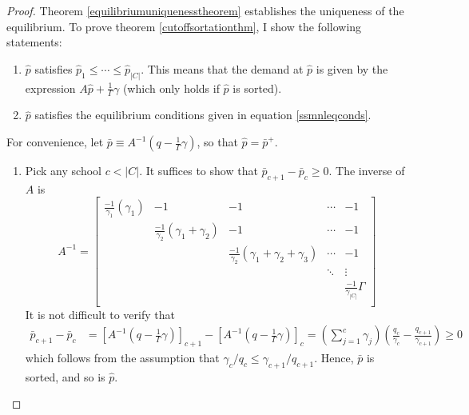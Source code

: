 \documentclass[12pt]{article}
\numberwithin{equation}{subsection}
\theoremstyle{definition}
\begin{document}
\begin{proof}
Theorem \ref{equilibriumuniquenesstheorem} establishes the uniqueness of the equilibrium. To prove theorem \ref{cutoffsortationthm}, I show the following statements:
\begin{enumerate}
\item $\hat p$ satisfies $\hat p_1 \leq \cdots \leq \hat p_{|C|}$. This means that the demand at $\hat p$ is given by the expression $A \hat p + \frac{1}{\Gamma}\gamma$ (which only holds if $\hat p$ is sorted).
\item $\hat p$ satisfies the equilibrium conditions given in equation \eqref{ssmnleqconds}.
\end{enumerate}

For convenience, let $\bar p \equiv A^{-1} (q - \frac{1}{\Gamma} \gamma) $, so that $\hat p = \bar p^+$. 
\begin{enumerate}
\item Pick any school $c < |C|$. It suffices to show that $\bar p_{c+1} - \bar p_{c} \geq 0$. The inverse of $A$ is
\begin{equation} \label{Ainv}
A^{-1} = \begin{bmatrix}
\frac{-1}{\gamma_1}\left( \gamma_1 \right) & -1 & -1 &\cdots & -1 \\
 & \frac{-1}{\gamma_2}\left( \gamma_1 + \gamma_2 \right) & -1 &\cdots & -1 \\
 & & \frac{-1}{\gamma_2}\left( \gamma_1 + \gamma_2 + \gamma_3 \right) &\cdots & -1 \\
 &  &  & \ddots & \vdots \\
 & & & &  \frac{-1}{\gamma_{|C|}} \Gamma \\
\end{bmatrix}
\end{equation}
It is not difficult to verify that
\begin{align} \label{barpissorted}
\bar p_{c+1} - \bar p_{c}
&= \left[A^{-1} (q - \frac{1}{\Gamma} \gamma) \right]_{c+1} - \left[A^{-1} (q - \frac{1}{\Gamma} \gamma) \right]_{c} = \left(\sum_{j=1}^c \gamma_j \right) \left(\frac{q_c}{\gamma_c} - \frac{q_{c+1}}{\gamma_{c+1}}\right) \geq 0
\end{align}
which follows from the assumption that $\gamma_c / q_c \leq \gamma_{c+1} / q_{c+1}$. Hence, $\bar p$ is sorted, and so is $\hat p$. 


\end{enumerate}
\end{proof}
\end{document}
